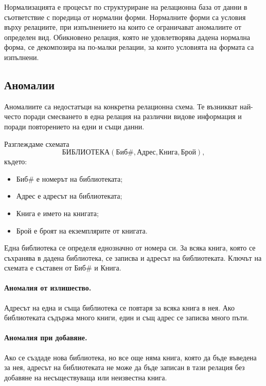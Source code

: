Нормализацията е процесът по структуриране на релационна база от данни в съответствие с поредица от нормални форми. Нормалните форми са условия върху релациите, при изпълнението на които се ограничават аномалиите от определен вид. Обикновено релация, която не удовлетворява дадена нормална форма, се декомпозира на по-малки релации, за които условията на формата са изпълнени.

\subsection{Аномалии}\label{s:24.1.2}

Аномалиите са недостатъци на конкретна релационна схема. Те възникват най-често поради смесването в една релация на различни видове информация и поради повторението на едни и същи данни.

Разглеждаме схемата
\[
\mathrm{БИБЛИОТЕКА}(\mathrm{Биб\#},\mathrm{Адрес},\mathrm{Книга},\mathrm{Брой}),
\]
където:

\begin{itemize}
    \item $\mathrm{Биб\#}$ е номерът на библиотеката;
    \item $\mathrm{Адрес}$ е адресът на библиотеката;
    \item $\mathrm{Книга}$ е името на книгата;
    \item $\mathrm{Брой}$ е броят на екземплярите от книгата.
\end{itemize}

Една библиотека се определя еднозначно от номера си. За всяка книга, която се съхранява в дадена библиотека, се записва и адресът на библиотеката. Ключът на схемата е съставен от $\mathrm{Биб\#}$ и $\mathrm{Книга}$.

\paragraph{Аномалия от излишество.}
Адресът на една и съща библиотека се повтаря за всяка книга в нея. Ако библиотеката съдържа много книги, един и същ адрес се записва много пъти.

\paragraph{Аномалия при добавяне.}
Ако се създаде нова библиотека, но все още няма книга, която да бъде въведена за нея, адресът на библиотеката не може да бъде записан в тази релация без добавяне на несъществуваща или неизвестна книга.


